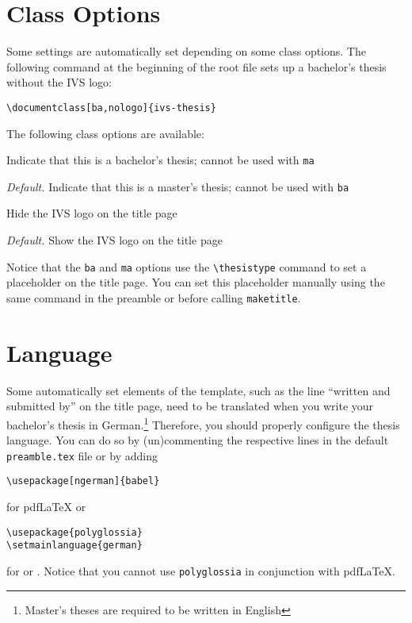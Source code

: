 \section{Class Options} \label{sec:class-options}

Some settings are automatically set depending on some class options. The following command at the beginning of the root file sets up a bachelor's thesis without the IVS logo:  
\begin{Verbatim}
\documentclass[ba,nologo]{ivs-thesis} 
\end{Verbatim}

The following class options are available: 
\begin{description}[font=\normalfont\ttfamily]
	\item[ba] Indicate that this is a bachelor's thesis; cannot be used with \texttt{ma} 
	\item[ma] \emph{Default.} Indicate that this is a master's thesis; cannot be used with \texttt{ba} 
	\item[nologo] Hide the IVS logo on the title page
	\item[logo] \emph{Default.} Show the IVS logo on the title page
\end{description}
Notice that the \texttt{ba} and \texttt{ma} options use the \verb|\thesistype| command to set a placeholder on the title page. You can set this placeholder manually using the same command in the preamble or before calling \texttt{maketitle}. 

\section{Language} \label{sec:language} 

Some automatically set elements of the template, such as the line \enquote{written and submitted by} on the title page, need to be translated when you write your bachelor's thesis in German.\footnote{Master's theses are required to be written in English} Therefore, you should properly configure the thesis language. You can do so by (un)commenting the respective lines in the default \texttt{preamble.tex} file or by adding 
\begin{Verbatim}
\usepackage[ngerman]{babel}
\end{Verbatim} 
for pdf\LaTeX{} or 
\begin{Verbatim}
\usepackage{polyglossia}
\setmainlanguage{german} 
\end{Verbatim}
for \LuaLaTeX{} or \XeLaTeX{}. Notice that you cannot use \texttt{polyglossia} in conjunction with pdf\LaTeX{}. 

